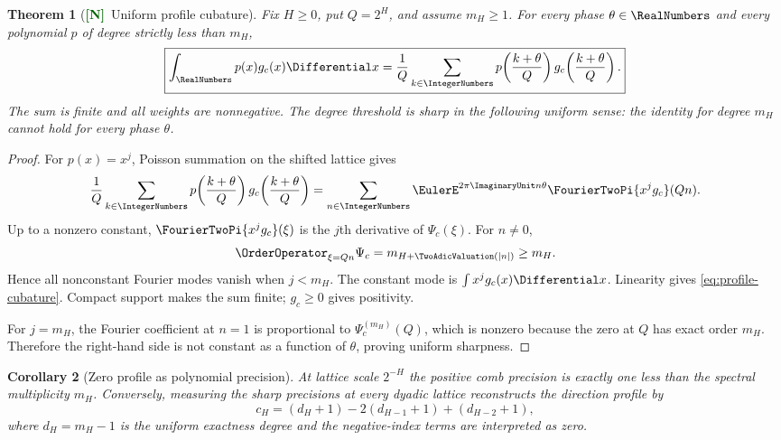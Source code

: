 \documentclass[11pt]{article}
\numberwithin{equation}{section}
\newtheorem{theorem}{Theorem}[section]
\newtheorem{corollary}[theorem]{Corollary}
\theoremstyle{definition}
\theoremstyle{remark}
\newcommand{\New}{\textcolor{darkgreen}{\textsf{\textbf{[N]}}}}
\begin{document}
\begin{theorem}[\New\ Uniform profile cubature]
\label{thm:profile-cubature}
Fix $H\ge0$, put $Q=2^H$, and assume $m_H\ge1$.  For every phase
$\theta\in\RealNumbers$ and every polynomial $p$ of degree strictly less than $m_H$,
\begin{equation}
 \boxed{
 \int_{\RealNumbers}p(x)g_c(x)\Differential x
 =\frac1Q\sum_{k\in\IntegerNumbers}
 p\!\left(\frac{k+\theta}{Q}\right)
 g_c\!\left(\frac{k+\theta}{Q}\right).}
 \label{eq:profile-cubature}
\end{equation}
The sum is finite and all weights are nonnegative.  The degree threshold is
sharp in the following uniform sense: the identity for degree $m_H$ cannot
hold for every phase $\theta$.
\end{theorem}

\begin{proof}
For $p(x)=x^j$, Poisson summation on the shifted lattice gives
\begin{equation}
 \frac1Q\sum_{k\in\IntegerNumbers}
 p\!\left(\frac{k+\theta}{Q}\right)
 g_c\!\left(\frac{k+\theta}{Q}\right)
 =\sum_{n\in\IntegerNumbers}\EulerE^{2\pi\ImaginaryUnit n\theta}
 \FourierTwoPi{x^jg_c}(Qn).
 \label{eq:Poisson-profile}
\end{equation}
Up to a nonzero constant,
$\FourierTwoPi{x^jg_c}(\xi)$ is the $j$th derivative of $\Psi_c(\xi)$.  For
$n\ne0$,
\[
 \OrderOperator_{\xi=Qn}\Psi_c
 =m_{H+\TwoAdicValuation(|n|)}\ge m_H.
\]
Hence all nonconstant Fourier modes vanish when $j<m_H$.  The constant mode is
$\int x^jg_c(x)\Differential x$.  Linearity gives \eqref{eq:profile-cubature}.  Compact
support makes the sum finite; $g_c\ge0$ gives positivity.

For $j=m_H$, the Fourier coefficient at $n=1$ is proportional to
$\Psi_c^{(m_H)}(Q)$, which is nonzero because the zero at $Q$ has exact order
$m_H$.  Therefore the right-hand side is not constant as a function of
$\theta$, proving uniform sharpness.
\end{proof}

\begin{corollary}[Zero profile as polynomial precision]
\label{cor:precision-profile}
At lattice scale $2^{-H}$ the positive comb precision is exactly one less than
the spectral multiplicity $m_H$.  Conversely, measuring the sharp precisions
at every dyadic lattice reconstructs the direction profile by
\begin{equation}
 c_H=(d_H+1)-2(d_{H-1}+1)+(d_{H-2}+1),
\end{equation}
where $d_H=m_H-1$ is the uniform exactness degree and the negative-index terms
are interpreted as zero.
\end{corollary}
\end{document}
